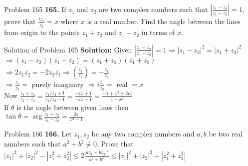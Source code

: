 \documentclass[aspectratio=169,8pt]{beamer}
\begin{document}
\begin{frame}{Problem 165}
  \textbf{165.} If $z_1$ and $z_2$ are two complex numbers such that $\left|\frac{z_1 - z_2}{z_1 + z_2}\right| = 1$, prove that
  $\frac{iz_1}{z_2} = x$ where $x$ is a real number. Find the angle between the lines from origin to the points $z_1 + z_2$ and
  $z_1 - z_2$ in terms of $x$.
\end{frame}
\begin{frame}{Solution of Problem 165}
  \textbf{Solution:} Given $\left|\frac{z_1 - z_2}{z_1 + z_2}\right| = 1 \Rightarrow |z_1 - z_2|^2 = |z_1 + z_2|^2$\\
  \vspace*{0.2cm}
  $\Rightarrow (z_1 - z_2)(\overline{z_1} - \overline{z_2}) = (z_1 + z_2)(\overline{z_1} + \overline{z_2})$\\
  \vspace*{0.2cm}
  $\Rightarrow 2z_1\overline{z_2} = -2z_2\overline{z_1} \Rightarrow \overline{\left(\frac{z_1}{z_2}\right)} = -\frac{z_1}{z_2}$\\
  \vspace*{0.2cm}
  $\Rightarrow \frac{z_1}{z_2} = $ purely imaginary $\Rightarrow i\frac{z_1}{z_2} =$ real $= x$\\
  \vspace*{0.2cm}
  Now $\frac{z_1 + z_2}{z_1 - z_2} = \frac{z_1/z_2 + 1}{z_1/z_2 - 1} = \frac{-ix + 1}{-ix - 1} = \frac{-1 + x^2 + 2ix}{1 + x^2}$\\
  \vspace*{0.2cm}
  If $\theta$ is the angle between given lines then\\
  \vspace*{0.2cm}
  $\tan\theta = \arg\frac{z_1 + z_2}{z_1 - z_2} = \frac{2x}{x^2 - 1}$
\end{frame}
\begin{frame}{Problem 166}
  \textbf{166.} Let $z_1, z_2$ be any two complex numbers and $a, b$ be two real numbers such that $a^2 + b^2 \neq 0$. Prove that
  $|z_1|^2 + |z_2|^2 - |z_1^2 + z_2^2| \leq 2\frac{|az_1 + bz_2|^2}{a^2 + b^2}\leq |z_1|^2 + |z_2|^2 + |z_1^2 + z_2^2|$
\end{frame}
\end{document}
